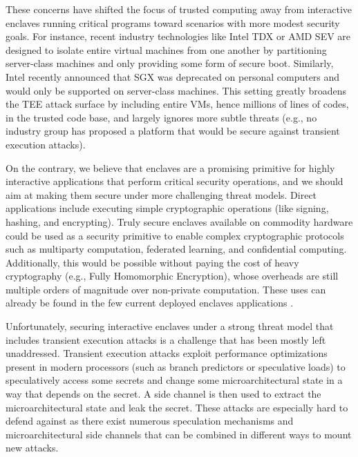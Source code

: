 These concerns have shifted the focus of trusted computing away from interactive enclaves running critical programs toward scenarios with more modest security goals.
For instance, recent industry technologies like Intel TDX or AMD SEV are designed to isolate entire virtual machines from one another
by partitioning server-class machines and only providing some form of secure boot.
Similarly, Intel recently announced that SGX was deprecated on personal computers and would only be supported on server-class machines.
This setting greatly broadens the TEE attack surface by including entire VMs, hence millions of lines of codes, in the trusted code base, and largely ignores more subtle threats (e.g., no industry group has proposed a platform that would be secure against transient execution attacks).

On the contrary, we believe that enclaves are a promising primitive for highly interactive applications that perform critical security operations, and we should aim at making them secure under more challenging threat models.
Direct applications include executing simple cryptographic operations (like signing, hashing, and encrypting).
Truly secure enclaves available on commodity hardware could be used as a security primitive to enable complex cryptographic protocols such as multiparty computation, federated learning, and confidential computing.
Additionally, this would be possible without paying the cost of heavy cryptography (e.g., Fully Homomorphic Encryption), whose overheads are still multiple orders of magnitude over non-private computation.
These uses can already be found in the few current deployed enclaves applications \cite{signalcontact, signalpin, signalvaluerecovery, zhang2016town, appleplatformsecurity, raj2016ftpm}.

Unfortunately, securing interactive enclaves under a strong threat model that includes transient execution attacks is a challenge that has been mostly left unaddressed. 
Transient execution attacks \cite{Kocher2018spectre, Lipp2018meltdown, behnia2021speculative}
exploit performance optimizations present in modern processors (such as branch predictors or speculative loads) to speculatively access some secrets and change some microarchitectural state in a way that depends on the secret.
A side channel is then used to extract the microarchitectural state and leak the secret.
These attacks are especially hard to defend against as there exist numerous speculation mechanisms and microarchitectural side channels that can be combined in different ways to mount new attacks.

